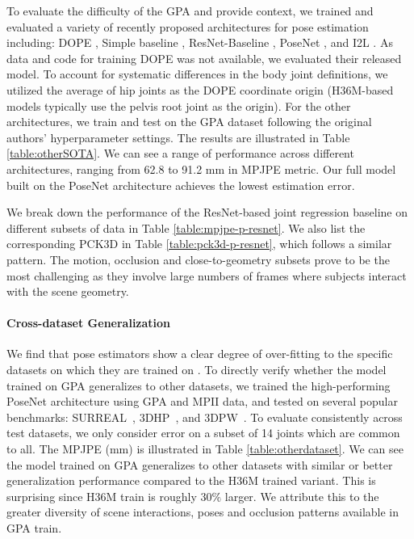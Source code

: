 \documentclass[times,referee,twocolumn,final,authoryear]{elsarticle}
\begin{document}
To evaluate the difficulty of the GPA and provide context, we trained and 
evaluated a variety of recently proposed architectures for pose estimation including: 
DOPE \cite{dope},  Simple baseline \cite{simple}, ResNet-Baseline \cite{Zhou_2017_ICCV}, 
PoseNet \cite{rootnet}, 
and I2L \cite{Moon_2020_ECCV_I2L-MeshNet}. As data and code for training DOPE was not available,
we evaluated their released model. To account for systematic differences in the body joint definitions,
we utilized the average of hip joints as the DOPE coordinate origin (H36M-based models typically 
use the pelvis root joint as the origin). For the other architectures, we train and 
test on the GPA dataset following the original authors' hyperparameter settings. The results are illustrated 
in Table \ref{table:otherSOTA}. We can see a range of performance across different architectures,
ranging from 62.8 to 91.2 mm in MPJPE metric. Our full model built on the PoseNet architecture 
achieves the lowest estimation error. 

We break down the performance of the ResNet-based joint regression baseline on different 
subsets of data in Table \ref{table:mpjpe-p-resnet}.  We also list the corresponding PCK3D 
in Table \ref{table:pck3d-p-resnet}, which follows a similar pattern.
The motion, occlusion and close-to-geometry subsets prove to be the most challenging 
as they involve large numbers of frames where subjects interact with the scene geometry. 

\paragraph{Cross-dataset Generalization}

We find that pose estimators show a clear degree of over-fitting to the specific datasets on which they are trained on
\citep{crossdatasetevaluation}.  To directly verify whether the model trained on GPA generalizes to other datasets, we trained the high-performing PoseNet architecture using GPA and MPII \cite{mpii} data, and tested on several popular benchmarks: SURREAL~\cite{varol17_surreal}, 3DHP~\cite{mono_3dhp2017}, and 3DPW~\cite{inthewildeccv2018}. To evaluate consistently 
across test datasets, we only consider error on a subset of 14 joints which are common to all.  The MPJPE (mm) is 
illustrated in Table \ref{table:otherdataset}. We can see the model trained on GPA generalizes to other datasets with
similar or better generalization performance compared to the H36M trained variant. This is  surprising since H36M
train is roughly $30\%$ larger. We attribute this to the greater diversity of scene interactions, poses and occlusion patterns 
available in GPA train.
\end{document}
